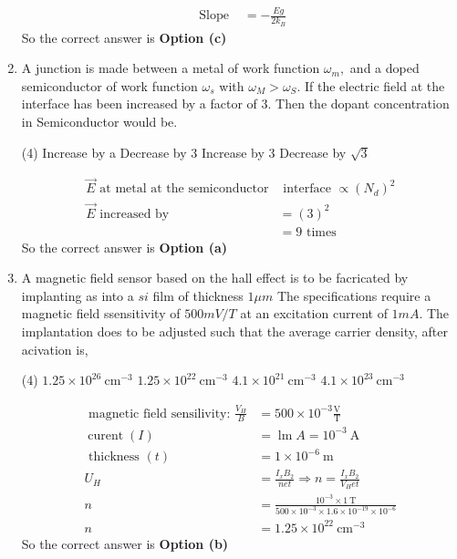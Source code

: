 \begin{enumerate}
\begin{answer}
\begin{align*}
	\text { Slope }&=-\frac{E g}{2 k_{B}}
	\end{align*}
	So the correct answer is \textbf{Option (c)}
\end{answer}
\item 
	A junction is made between a metal of work function $\omega_m ,$  and a doped semiconductor of work function $\omega_s$ with $\omega_{M}>\omega_{S} $. If the electric field at the interface has been increased by a factor of $3$. Then the dopant concentration in Semiconductor would be. 
	\begin{tasks}(4)
		\task[\textbf{a.}]Increase by a
		\task[\textbf{b.}]Decrease by 3
		\task[\textbf{c.}]Increase by 3
		\task[\textbf{d.}]Decrease by $\sqrt{3}$
	\end{tasks}
\begin{answer}
	\begin{align*}
	\vec{E} \text { at metal at the semiconductor} &\text { interface } \propto\left(N_{d}\right)^{2}\\
	\vec{E} \text { increased by } &=(3)^{2} \\
	&=9 \text { times }
	\end{align*}
	So the correct answer is \textbf{Option (a)}
\end{answer}
\item 
	A magnetic field sensor based on the hall effect is to be facricated by implanting as into a $si$ film of thickness $1\mu m$
	The specifications require a magnetic field ssensitivity of $500 mV/T$ at an excitation current of $1 mA$. The implantation does to be adjusted such that the average carrier density, after acivation is,
	\begin{tasks}(4)
		\task[\textbf{a.}] $1.25 \times 10^{26} \mathrm{~cm}^{-3}$
		\task[\textbf{b.}]$1.25 \times 10^{22} \mathrm{~cm}^{-3}$
		\task[\textbf{c.}]$4.1 \times 10^{21} \mathrm{~cm}^{-3}$
		\task[\textbf{d.}] $4.1 \times 10^{23} \mathrm{~cm}^{-3}$
	\end{tasks}
\begin{answer}
	\begin{align*}\text { magnetic field sensilivity: } \frac{V_{H}}{B}&=500 \times 10^{-3} \frac{\mathrm{V}}{\mathrm{T}}\\
	\operatorname{curent}(I)&=\operatorname{lm} A=10^{-3} \mathrm{~A}\\
	\text { thickness }(t)&=1 \times 10^{-6} \mathrm{~m}\\
	U_{H}&=\frac{I_{x} B_{2}}{n e t} \Rightarrow n=\frac{I_{x} B_{2}}{V_{H} e t}\\
	n&=\frac{10^{-3} \times 1 \mathrm{~T}}{500 \times 10^{-3} \times 1.6 \times 10^{-19} \times 10^{-6}} \\
	n&=1.25 \times 10^{22} \mathrm{~cm}^{-3}
	\end{align*}
	So the correct answer is \textbf{Option (b)}
\end{answer}
\end{enumerate}